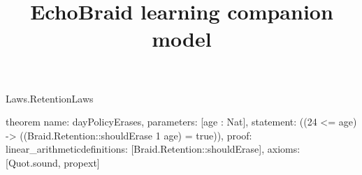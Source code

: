 \begin{lexlean}{Laws.RetentionLaws}
\title{EchoBraid learning companion model}
\begin{semanticmodule}
theorem{
  name: dayPolicyErases,
  parameters: [age : Nat],
  statement: ((24 <= age) -> ((Braid.Retention::shouldErase 1 age) = true)),
  proof: linear_arithmetic{definitions: [Braid.Retention::shouldErase]},
  axioms: [Quot.sound, propext]
}
\end{semanticmodule}
\end{lexlean}
